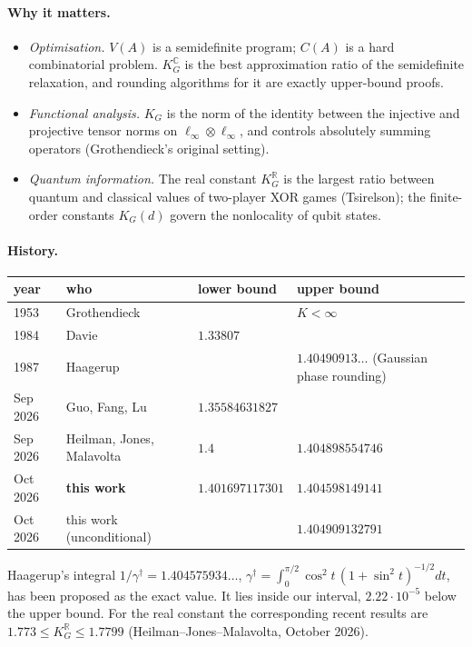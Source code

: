 \documentclass[11pt,a4paper]{article}
\newcommand{\C}{\mathbb{C}}
\newcommand{\R}{\mathbb{R}}
\newcommand{\KG}{K_G^{\C}}
\begin{document}
\paragraph{Why it matters.}
\begin{itemize}
\item \emph{Optimisation.} $V(A)$ is a semidefinite program; $C(A)$ is a hard combinatorial problem. $\KG$ is the best
 approximation ratio of the semidefinite relaxation, and rounding algorithms for it are exactly upper-bound proofs.
\item \emph{Functional analysis.} $K_G$ is the norm of the identity between the injective and projective tensor
 norms on $\ell_\infty\otimes\ell_\infty$, and controls absolutely summing operators (Grothendieck's original setting).
\item \emph{Quantum information.} The real constant $K_G^{\R}$ is the largest ratio between quantum and classical values of
 two-player XOR games (Tsirelson); the finite-order constants $K_G(d)$ govern the nonlocality of qubit states.
\end{itemize}

\paragraph{History.}
\begin{center}\small
\begin{tabular}{@{}llll@{}}\toprule
year & who & lower bound & upper bound\\\midrule
1953 & Grothendieck & & $K<\infty$\\
1984 & Davie & $1.33807$ & \\
1987 & Haagerup & & $1.40490913\ldots$ (Gaussian phase rounding)\\
Sep 2026 & Guo, Fang, Lu & $1.35584631827$ & \\
Sep 2026 & Heilman, Jones, Malavolta & $1.4$ & $1.404898554746$\\
Oct 2026 & \textbf{this work} & $\mathbf{1.401697117301}$ & $\mathbf{1.404598149141}$\\
Oct 2026 & this work (unconditional) & & $1.404909132791$\\\bottomrule
\end{tabular}
\end{center}
Haagerup's integral
$1/\gamma^\dagger=1.404575934\ldots$, $\gamma^\dagger=\int_0^{\pi/2}\cos^2t\,(1+\sin^2t)^{-1/2}dt$, has been proposed as the
exact value. It lies inside our interval, $2.22\cdot10^{-5}$ below the upper bound. For the real constant the corresponding
recent results are $1.773\le K_G^{\R}\le1.7799$ (Heilman--Jones--Malavolta, October 2026).
\end{document}
